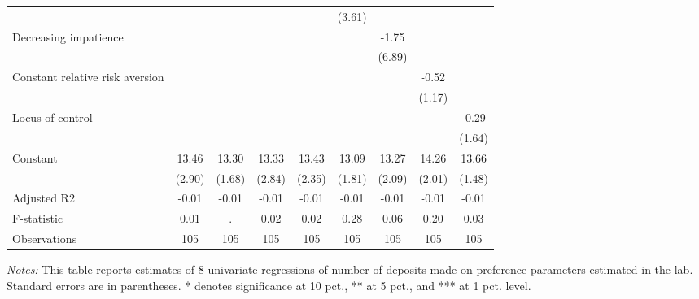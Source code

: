 \begin{table}[htbp]
{\begin{threeparttable}
\begin{tabular}{l*{8}{c}}
                &                  &                  &                  &                  &   (3.61)         &                  &                  &                  \\
Decreasing impatience&                  &                  &                  &                  &                  &    -1.75         &                  &                  \\
                &                  &                  &                  &                  &                  &   (6.89)         &                  &                  \\
Constant relative risk aversion&                  &                  &                  &                  &                  &                  &    -0.52         &                  \\
                &                  &                  &                  &                  &                  &                  &   (1.17)         &                  \\
Locus of control&                  &                  &                  &                  &                  &                  &                  &    -0.29         \\
                &                  &                  &                  &                  &                  &                  &                  &   (1.64)         \\
Constant        &    13.46\sym{***}&    13.30\sym{***}&    13.33\sym{***}&    13.43\sym{***}&    13.09\sym{***}&    13.27\sym{***}&    14.26\sym{***}&    13.66\sym{***}\\
                &   (2.90)         &   (1.68)         &   (2.84)         &   (2.35)         &   (1.81)         &   (2.09)         &   (2.01)         &   (1.48)         \\
\midrule
Adjusted R2     &    -0.01         &    -0.01         &    -0.01         &    -0.01         &    -0.01         &    -0.01         &    -0.01         &    -0.01         \\
F-statistic     &     0.01         &        .         &     0.02         &     0.02         &     0.28         &     0.06         &     0.20         &     0.03         \\
Observations    &      105         &      105         &      105         &      105         &      105         &      105         &      105         &      105         \\
\bottomrule \end{tabular} \begin{tablenotes}[flushleft] \footnotesize \item \emph{Notes:} This table reports estimates of 8 univariate regressions of number of deposits made on preference parameters estimated in the lab. Standard errors are in parentheses. * denotes significance at 10 pct., ** at 5 pct., and *** at 1 pct. level. \end{tablenotes} \end{threeparttable} } \end{table}
